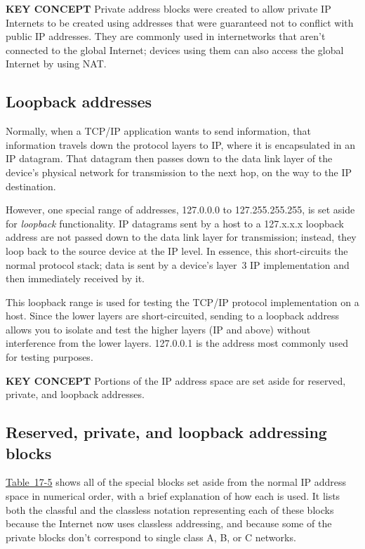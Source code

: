 {\textbf{KEY CONCEPT}} Private address blocks were created to allow
private IP Internets to be created using addresses that were guaranteed
not to conflict with public IP addresses. They are commonly used in
internetworks that aren't connected to the global Internet; devices
using them can also access the global Internet by using NAT.



\subsection{Loopback addresses}

Normally, when a TCP/IP application wants to send information, that
information travels down the protocol layers to IP, where it is
encapsulated in an IP datagram. That datagram then passes down to the
data link layer of the device's physical network for transmission to the
next hop, on the way to the IP
destination.\protect\hypertarget{ch17s05.htmlux5cux23idx-CHP-17-0703}{}{}

However, one special range of addresses, 127.0.0.0 to 127.255.255.255,
is set aside for {\emph{loopback}} functionality. IP datagrams sent by a
host to a 127.x.x.x loopback address are not passed down to the data
link layer for transmission; instead, they loop back to the source
device at the IP level. In essence, this short-circuits the normal
protocol stack; data is sent by a device's layer~3 IP implementation and
then immediately received by it.

This loopback range is used for testing the TCP/IP protocol
implementation on a host. Since the lower layers are short-circuited,
sending to a loopback address allows you to isolate and test the higher
layers (IP and above) without interference from the lower layers.
\protect\hypertarget{ch17s05.htmlux5cux23idx-CHP-17-0704}{}{}127.0.0.1
is the address most commonly used for testing purposes.


{\textbf{KEY CONCEPT}} Portions of the IP address space are set aside
for reserved, private, and loopback addresses.




\subsection{Reserved, private, and loopback addressing blocks}

\protect\hyperlink{ch17s05.htmlux5cux23reserved_private_and_loopback_ip_address}{Table~17-5}
shows all of the special blocks set aside from the normal
\protect\hypertarget{ch17s05.htmlux5cux23idx-CHP-17-0705}{}{}IP address
space in numerical order, with a brief explanation of how each is used.
It lists both the classful and the classless notation representing each of these blocks because the Internet now uses classless addressing, and because some of the private blocks don't correspond to single class A, B, or C networks.

